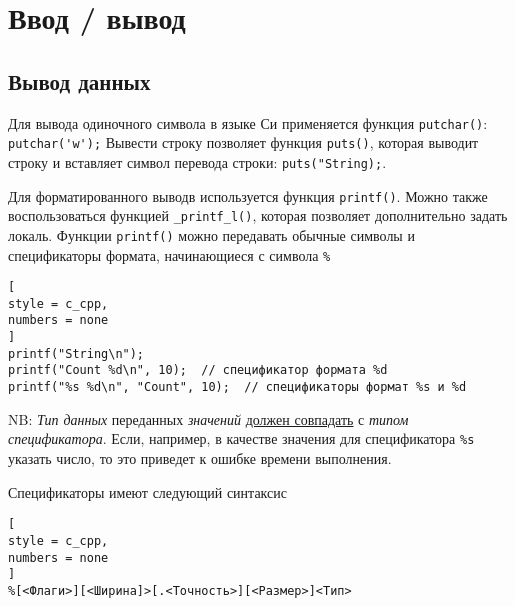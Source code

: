 \documentclass[%
	11pt,
	a4paper,
	utf8,
		]{article}
\begin{document}
\section{Ввод / вывод}

\subsection{Вывод данных}

Для вывода одиночного символа в языке Си применяется функция \verb*|putchar()|: \verb|putchar('w');| Вывести строку позволяет функция \verb*|puts()|, которая выводит строку и вставляет символ перевода строки: \verb|puts("String);|.

Для форматированного выводв используется функция \verb*|printf()|. Можно также воспользоваться функцией \verb|_printf_l()|, которая позволяет дополнительно задать локаль. Функции \verb*|printf()| можно передавать обычные символы и спецификаторы формата, начинающиеся с символа \verb|%|
\begin{lstlisting}[
style = c_cpp,
numbers = none	
]
printf("String\n");
printf("Count %d\n", 10);  // спецификатор формата %d
printf("%s %d\n", "Count", 10);  // спецификаторы формат %s и %d
\end{lstlisting}

NB: \emph{Тип данных} переданных \emph{значений} \underline{должен совпадать} с \emph{типом спецификатора}. Если, например, в качестве значения для спецификатора \verb*|%s| указать число, то это приведет к ошибке времени выполнения.

Спецификаторы имеют следующий синтаксис \cite[]{prokhorenok-prog-c:2020}
\begin{lstlisting}[
style = c_cpp,
numbers = none
]
%[<Флаги>][<Ширина]>[.<Точность>][<Размер>]<Тип>
\end{lstlisting}
\end{document}
